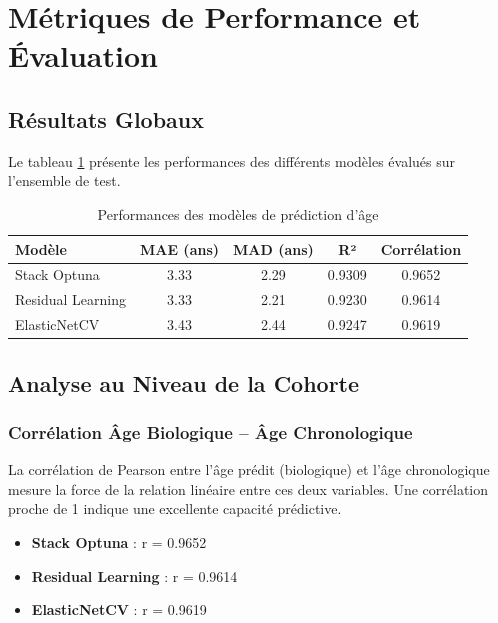 \documentclass[11pt,a4paper]{article}
\begin{document}
\section{Métriques de Performance et Évaluation}

\subsection{Résultats Globaux}

Le tableau \ref{tab:metrics} présente les performances des différents modèles évalués 
sur l'ensemble de test.

\begin{table}[htbp]
\centering
\begin{tabular}{lcccc}
\hline
\textbf{Modèle} & \textbf{MAE (ans)} & \textbf{MAD (ans)} & \textbf{R²} & \textbf{Corrélation} \\
\hline
Stack Optuna & 3.33 & 2.29 & 0.9309 & 0.9652 \\
Residual Learning & 3.33 & 2.21 & 0.9230 & 0.9614 \\
ElasticNetCV & 3.43 & 2.44 & 0.9247 & 0.9619 \\
\hline
\end{tabular}
\caption{Performances des modèles de prédiction d'âge}
\label{tab:metrics}
\end{table}

\subsection{Analyse au Niveau de la Cohorte}

\subsubsection{Corrélation Âge Biologique -- Âge Chronologique}

La corrélation de Pearson entre l'âge prédit (biologique) et l'âge chronologique mesure 
la force de la relation linéaire entre ces deux variables. Une corrélation proche de 1 
indique une excellente capacité prédictive.

\begin{itemize}
    \item \textbf{Stack Optuna} : r = 0.9652
    \item \textbf{Residual Learning} : r = 0.9614
    \item \textbf{ElasticNetCV} : r = 0.9619
\end{itemize}
\end{document}
